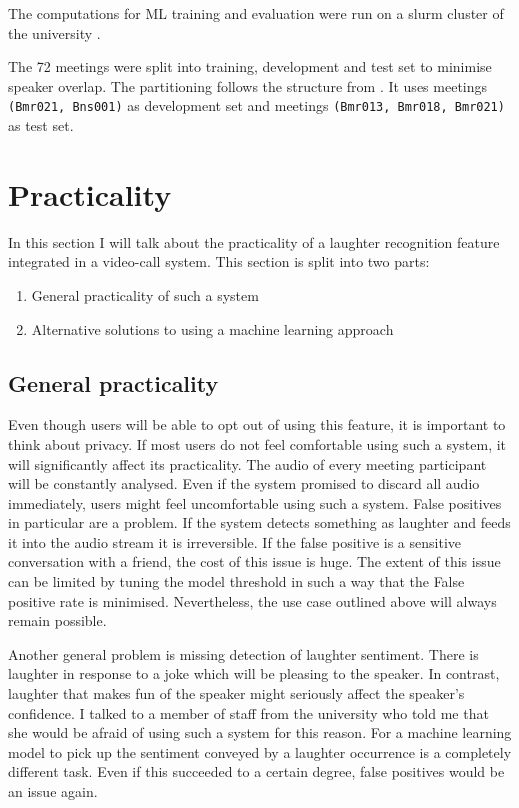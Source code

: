 \documentclass[bsc,frontabs,parskip,deptreport]{infthesis}
\begin{document}
The computations for ML training and evaluation were run on a slurm cluster of the university \citep{yoo2003slurm, tange2011gnu}.

The 72 meetings were split into training, development and test set to minimise speaker overlap. The partitioning follows the structure from \citeauthor{renals2014neural}. It uses meetings \texttt{(Bmr021, Bns001)} as development set and meetings \texttt{(Bmr013, Bmr018, Bmr021)} as test set.


\section{Practicality}
In this section I will talk about the practicality of a laughter recognition feature integrated in a video-call system. 
This section is split into two parts: 
\begin{enumerate}
    \item General practicality of such a system
    \item Alternative solutions to using a machine learning approach 
\end{enumerate}

\subsection{General practicality} \label{sec:general-pract}
Even though users will be able to opt out of using this feature, it is important to think about privacy. If most users do not feel comfortable using such a system, it will significantly affect its practicality.  
The audio of every meeting participant will be constantly analysed. Even if the system promised to discard all audio immediately, users might feel uncomfortable using such a system. False positives in particular are a problem. If the system detects something as laughter and feeds it into the audio stream it is irreversible. If the false positive is a sensitive conversation with a friend, the cost of this issue is huge. 
The extent of this issue can be limited by tuning the model threshold in such a way that the False positive rate is minimised. Nevertheless, the use case outlined above will always remain possible. 

Another general problem is missing detection of laughter sentiment. There is laughter in response to a joke which will be pleasing to the speaker. In contrast, laughter that makes fun of the speaker might seriously affect the speaker's confidence. I talked to a member of staff from the university who told me that she would be afraid of using such a system for this reason. 
For a machine learning model to pick up the sentiment conveyed by a laughter occurrence is a completely different task. Even if this succeeded to a certain degree, false positives would be an issue again. 
\end{document}
